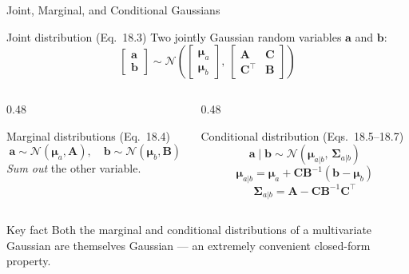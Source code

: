 \documentclass[aspectratio=169,10pt]{beamer}
\newcommand{\bmu}{\boldsymbol{\mu}}
\newcommand{\bSigma}{\boldsymbol{\Sigma}}
\newcommand{\Norm}{\mathcal{N}}
\begin{document}
\begin{frame}{Joint, Marginal, and Conditional Gaussians}
  \begin{block}{Joint distribution (Eq.\ 18.3)}
    Two jointly Gaussian random variables $\mathbf{a}$ and $\mathbf{b}$:
    \[
      \begin{bmatrix}\mathbf{a}\\\mathbf{b}\end{bmatrix}
      \sim \Norm\!\left(
        \begin{bmatrix}\bmu_a\\\bmu_b\end{bmatrix},\,
        \begin{bmatrix}\mathbf{A} & \mathbf{C}\\\mathbf{C}^\top & \mathbf{B}\end{bmatrix}
      \right)
    \]
  \end{block}
  \vspace{0.2em}
  \begin{columns}[T]
    \begin{column}{0.48\textwidth}
      \begin{block}{Marginal distributions (Eq.\ 18.4)}
        \[
          \mathbf{a}\sim\Norm(\bmu_a,\mathbf{A}),\quad
          \mathbf{b}\sim\Norm(\bmu_b,\mathbf{B})
        \]
        \emph{Sum out} the other variable.
      \end{block}
    \end{column}
    \begin{column}{0.48\textwidth}
      \begin{block}{Conditional distribution (Eqs.\ 18.5--18.7)}
        \[
          \mathbf{a}\mid\mathbf{b}
          \sim \Norm(\bmu_{a|b},\,\bSigma_{a|b})
        \]
        \[
          \bmu_{a|b}   = \bmu_a + \mathbf{C}\mathbf{B}^{-1}(\mathbf{b}-\bmu_b)
        \]
        \[
          \bSigma_{a|b} = \mathbf{A} - \mathbf{C}\mathbf{B}^{-1}\mathbf{C}^\top
        \]
      \end{block}
    \end{column}
  \end{columns}
  \vspace{0.3em}
  \begin{alertblock}{Key fact}
    Both the marginal and conditional distributions of a multivariate Gaussian
    are themselves Gaussian --- an extremely convenient closed-form property.
  \end{alertblock}
\end{frame}
\end{document}
